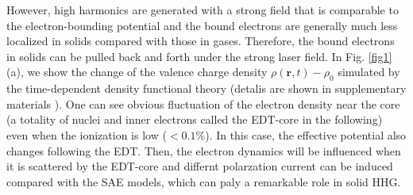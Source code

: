 \documentclass[aps,prl,10pt,preprint,nofootinbib]{revtex4-1}
\begin{document}
However, high harmonics are generated with a strong field that is comparable to the electron-bounding potential and the bound electrons are generally much less localized in solids compared with those in gases. Therefore, the bound electrons in solids can be pulled back and forth under the strong laser field. In Fig. \ref{fig1}(a), we show the change of the valence charge density $\rho(\textbf{r},t)-\rho_{0}$ simulated by the time-dependent density functional theory \cite{Andrade2015} (detalis are shown in supplementary materials \cite{SM}). One can see obvious fluctuation of the electron density near the core (a totality of nuclei and inner electrons called the EDT-core in the following) even when the ionization is low ($<0.1\%$). In this case, the effective potential also changes following the EDT. Then, the electron dynamics will be influenced when it is scattered by the EDT-core and differnt polarzation current can be induced compared with the SAE models, which can paly a remarkable role in solid HHG. 
\end{document}
